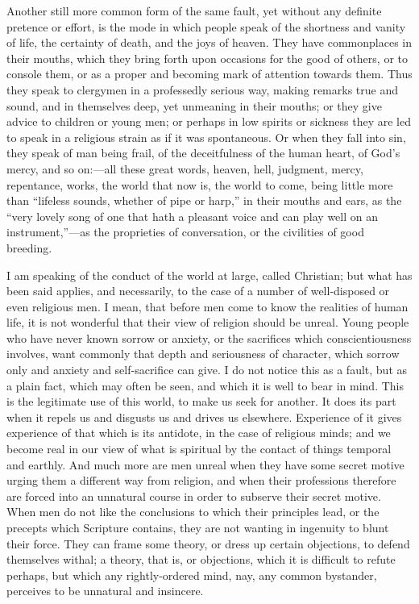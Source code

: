 Another still more common form of the same fault, yet without any
definite pretence or effort, is the mode in which people speak of the
shortness and vanity of life, the certainty of death, and the joys of
heaven. They have commonplaces in their mouths, which they bring forth
upon occasions for the good of others, or to console them, or as a
proper and becoming mark of attention towards them. Thus they speak to
clergymen in a professedly serious way, making remarks true and sound,
and in themselves deep, yet unmeaning in their mouths; or they give
advice to children or young men; or perhaps in low spirits or sickness
they are led to speak in a religious strain as if it was spontaneous.
Or when they fall into sin, they speak of man being frail, of the
deceitfulness of the human heart, of God's mercy, and so on:—all
these great words, heaven, hell, judgment, mercy, repentance, works,
the world that now is, the world to come, being little more than
``lifeless sounds, whether of pipe or harp,'' in their mouths
and ears, as the ``very lovely song of one that hath a pleasant
voice and can play well on an instrument,''—as the proprieties
of conversation, or the civilities of good breeding.

I am speaking of the conduct of the world at large, called
Christian; but what has been said applies, and necessarily, to the
case of a number of well-disposed or even religious men. I mean, that
before men come to know the realities of human life, it is not
wonderful that their view of religion should be unreal. Young people
who have never known sorrow or anxiety, or the sacrifices which
conscientiousness involves, want commonly that depth and seriousness
of character, which sorrow only and anxiety and self-sacrifice can
give. I do not notice this as a fault, but as a plain fact, which may
often be seen, and which it is well to bear in mind. This is the
legitimate use of this world, to make us seek for another. It does its
part when it repels us and disgusts us and drives us elsewhere.
Experience of it gives experience of that which is its antidote, in
the case of religious minds; and we become real in our view of what is
spiritual by the contact of things temporal and earthly. And much more
are men unreal when they have some secret motive urging them a
different way from religion, and when their professions therefore are
forced into an unnatural course in order to subserve their secret
motive. When men do not like the conclusions to which their principles
lead, or the precepts which Scripture contains, they are not wanting
in ingenuity to blunt their force. They can frame some theory, or
dress up certain objections, to defend themselves withal; a theory,
that is, or objections, which it is difficult to refute perhaps, but
which any rightly-ordered mind, nay, any common bystander, perceives
to be unnatural and insincere.


